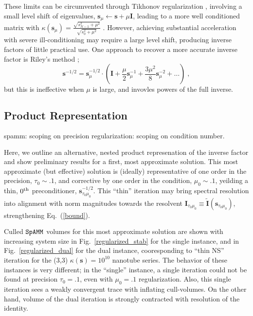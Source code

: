 \documentclass[letterpaper,twocolumn,amsmath,amsfont,amssymb,english,aps,jcp,preprintnumbers,groupaddress,nofootinbib,tightenlines,floatfix]{revtex4}
\newcommand{\mat}[1]{\boldsymbol{#1}}
\theoremstyle{plain}
\theoremstyle{remark}
\theoremstyle{plain}
\begin{document}
These limits can be circumvented through Tikhonov regularization \cite{}, 
involving a small level shift of eigenvalues,  $\mat{s}_\mu \leftarrow \mat{s}+\mu \mat{I}$, leading to a more 
well conditioned matrix with $\kappa( \mat{s}_\mu) = \frac{\sqrt{s^2_{N-1} + \mu^2}}{\sqrt{s^2_0+\mu^2}}$ \cite{}.  
However, achieving substantial acceleration with severe ill-conditioning  may require a large level shift, 
producing inverse factors of little practical use.  One approach to recover a more accurate inverse
factor is Riley's method \cite{}; 
\begin{equation}
\mat{s}^{-1/2} = \mat{s}^{-1/2}_{\mu} \cdot \left( \mat{I}+\frac{\mu}{2} \mat{s}^{-1}_{\mu}
                                                   +\frac{3 \mu^2}{8} \mat{s}^{-2}_{\mu} + \dots
   \right) \; ,
\end{equation}
but this is ineffective when $\mu$ is large, and invovles powers of the full inverse. 

\subsection{Product Representation}

spamm: scoping on precision
regularization: scoping on condition number.

Here, we outline an alternative,  nested product represenation of the inverse factor and show preliminary 
results for a first, most approximate solution.  This most approximate (but effective) solution is (ideally) representative 
of one order in the precision, $\tau_0\sim .1$, and corrective by one order in the condition, $\mu_0\sim .1$,
yeilding a thin, $0^{\rm th}$ preconditioner, $\mat{s}^{-1/2}_{\tau_0 \mu_0}$.  
This ``thin'' iteration may bring spectral resolution into alignment with norm magnitudes 
towards the resolvent $\mat{I}_{\tau_0\mu_0}\equiv \widetilde{\mat{I}}\left(\mat{s}_{\tau_0\mu_0}\right)$,
strengthening Eq.~(\ref{bound}).

Culled $\tt SpAMM$ volumes for this most approximate solution are shown with increasing system size in 
Fig.~\ref{regularized_stab} for the single instance, and in Fig.~\ref{regularized_dual} for the dual instance, 
cooresponding to ``thin NS'' iteration for the (3,3) $\kappa(\mat{s})=10^{10}$ nanotube series.  
The behavior of these instances is very different; in the ``single'' 
instance, a single iteration could not be found at precision $\tau_0=.1$, even with $\mu_0=.1$ regularization.  
Also, this single iteration
sees a weakly convergent trace with inflating cull-volumes. On the other hand, volume of the dual iteration 
is strongly contracted with resolution of the identity.  
 
\end{document}
